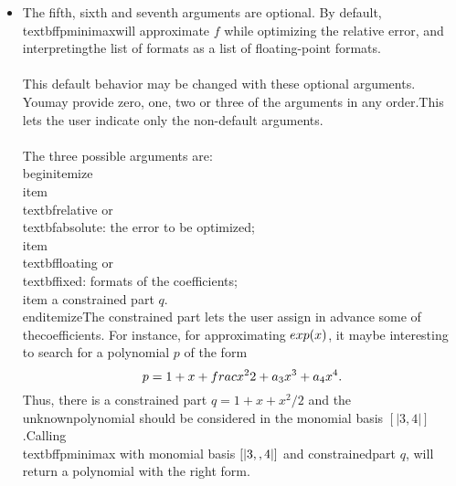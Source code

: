 \begin{itemize}
\item The fifth, sixth and seventh arguments are optional. By default, \\textbf{fpminimax}\n   will approximate $f$ while optimizing the relative error, and interpreting\n   the list of formats as a list of floating-point formats.\\\\\n   This default behavior may be changed with these optional arguments. You\n   may provide zero, one, two or three of the arguments in any order.\n   This lets the user indicate only the non-default arguments.\\\\\n   The three possible arguments are: \\begin{itemize}\n   \\item \\textbf{relative} or \\textbf{absolute}: the error to be optimized;\n   \\item \\textbf{floating} or \\textbf{fixed}: formats of the coefficients;\n   \\item a constrained part $q$.\n   \\end{itemize}\n   The constrained part lets the user assign in advance some of the\n   coefficients. For instance, for approximating $\\exp(x)$, it may\n   be interesting to search for a polynomial $p$ of the form\n                   $$p = 1 + x + \\frac{x^2}{2} + a_3 x^3 + a_4 x^4.$$\n   Thus, there is a constrained part $q = 1 + x + x^2/2$ and the unknown\n   polynomial should be considered in the monomial basis $[|3, 4|]$.\n   Calling \\textbf{fpminimax} with monomial basis $[|3,\\,4|]$ and constrained\n   part $q$, will return a polynomial with the right form.\n

\end{itemize}
